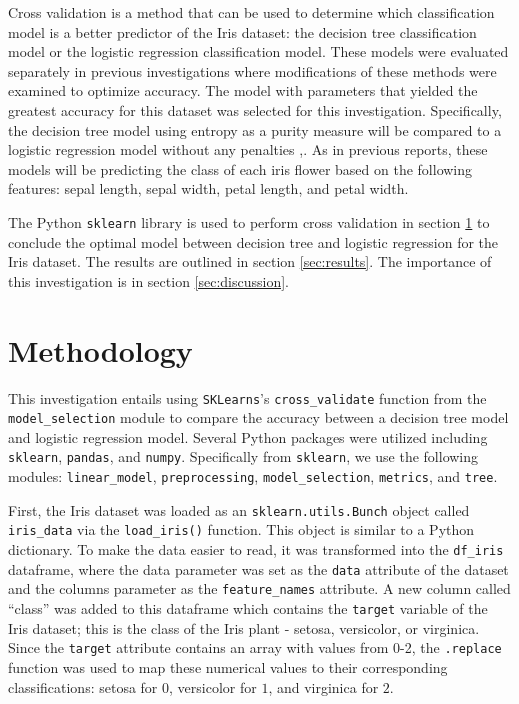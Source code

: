 \documentclass[journal]{IEEEtran}
\begin{document}
Cross validation is a method that can be used to determine which classification model is a better predictor of the Iris dataset: the decision tree classification model or the logistic regression classification model. These models were evaluated separately in previous investigations where modifications of these methods were examined to optimize accuracy. The model with parameters that yielded the greatest accuracy for this dataset was selected for this investigation. Specifically, the decision tree model using entropy as a purity measure will be compared to a logistic regression model without any penalties \cite{b2},\cite{b3}. As in previous reports, these models will be predicting the class of each iris flower based on the following features: sepal length, sepal width, petal length, and petal width.

The Python \lstinline{sklearn} library is used to perform cross validation in section \ref{sec:methodology} to conclude the optimal model between decision tree and logistic regression for the Iris dataset. The results are outlined in section \ref{sec:results}. The importance of this investigation is in section \ref{sec:discussion}. 

\vspace{30pxs}

\section{Methodology}
\label{sec:methodology}

This investigation entails using \lstinline{SKLearns}'s \lstinline{cross_validate} function from the \lstinline{model_selection} module to compare the accuracy between a decision tree model and logistic regression model. Several Python packages were utilized including \lstinline{sklearn}, \lstinline{pandas}, and \lstinline{numpy}. Specifically from \lstinline{sklearn}, we use the following modules: \lstinline{linear_model}, \lstinline{preprocessing}, \lstinline{model_selection}, \lstinline{metrics}, and \lstinline{tree}. 

First, the Iris dataset was loaded as an \lstinline{sklearn.utils.Bunch} object called \lstinline{iris_data} via the \lstinline{load_iris()} function. This object is similar to a Python dictionary. To make the data easier to read, it was transformed into the \lstinline{df_iris} dataframe, where the data parameter was set as the \lstinline{data} attribute of the dataset and the columns parameter as the \lstinline{feature_names} attribute. A new column called “class” was added to this dataframe which contains the \lstinline{target} variable of the Iris dataset; this is the class of the Iris plant - setosa, versicolor, or virginica. Since the \lstinline{target} attribute contains an array with values from 0-2, the \lstinline{.replace} function was used to map these numerical values to their corresponding classifications: setosa for \(0\), versicolor for \(1\), and virginica for \(2\). 
\end{document}

